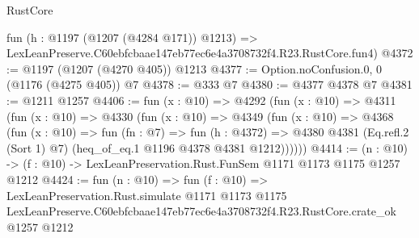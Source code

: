\begin{lexlean}{RustCore}
\begin{coremodule}
    fun (h : @1197 (@1207 (@4284 @171)) @1213) =>
    LexLeanPreserve.C60ebfcbaae147eb77ec6e4a3708732f4.R23.RustCore.fun4)
@4372 := @1197 (@1207 (@4270 @405)) @1213
@4377 := Option.noConfusion.{0, 0} (@1176 (@4275 @405)) @7
@4378 := @333 @7
@4380 := @4377 @4378 @7
@4381 := @1211 @1257
@4406 := fun (x : @10) =>
  @4292
    (fun (x : @10) =>
    @4311
      (fun (x : @10) =>
      @4330
        (fun (x : @10) =>
        @4349
          (fun (x : @10) =>
          @4368
            (fun (x : @10) =>
            fun (fn : @7) =>
            fun (h : @4372) =>
            @4380 @4381 (Eq.refl.{2} (Sort 1) @7) (heq_of_eq.{1} @1196 @4378 @4381 @1212))))))
@4414 := (n : @10) -> (f : @10) -> LexLeanPreservation.Rust.FunSem @1171 @1173 @1175 @1257 @1212
@4424 := fun (n : @10) =>
  fun (f : @10) =>
  LexLeanPreservation.Rust.simulate
    @1171
    @1173
    @1175
    LexLeanPreserve.C60ebfcbaae147eb77ec6e4a3708732f4.R23.RustCore.crate_ok
    @1257
    @1212
\end{coremodule}
\end{lexlean}
